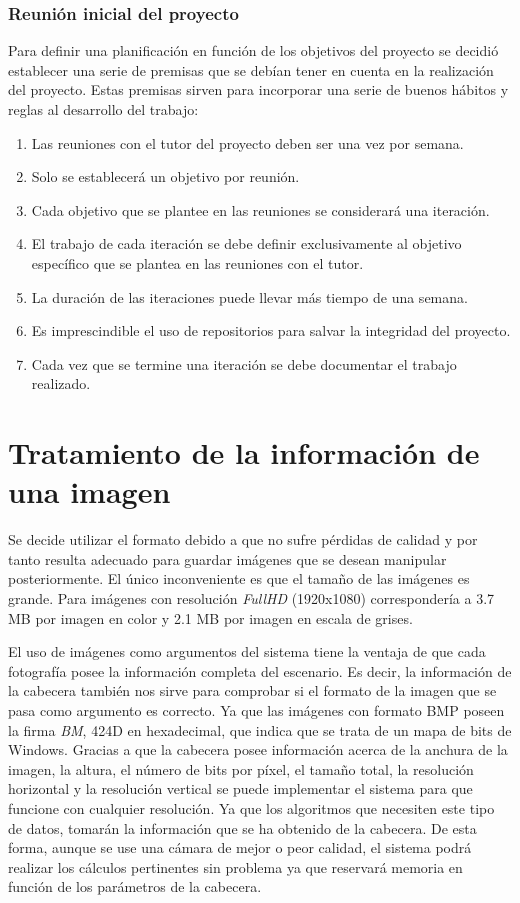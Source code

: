 \subsubsection{Reunión inicial del proyecto}\label{sec:Reunion}

Para definir una planificación en función de los objetivos del proyecto se decidió establecer una serie de premisas que se debían tener en cuenta en la realización del proyecto. Estas premisas sirven para incorporar una serie de buenos hábitos y reglas al desarrollo del trabajo: 

\begin{enumerate}
\item Las reuniones con el tutor del proyecto deben ser una vez por semana.
\item Solo se establecerá un objetivo por reunión.
\item Cada objetivo que se plantee en las reuniones se considerará una iteración.
\item El trabajo de cada iteración se debe definir exclusivamente al objetivo específico que se plantea en las reuniones con el tutor.
\item La duración de las iteraciones puede llevar más tiempo de una semana.
\item Es imprescindible el uso de repositorios para salvar la integridad del proyecto.
\item Cada vez que se termine una iteración se debe documentar el trabajo realizado.
\end{enumerate}

\section{Tratamiento de la información de una imagen}\label{sec:CabeceraBMP} 
Se decide utilizar el formato  debido a que no sufre pérdidas de calidad y por tanto resulta adecuado para guardar imágenes que se desean manipular posteriormente. El único inconveniente es que el tamaño de las imágenes es grande. Para imágenes con resolución \emph{FullHD} (1920x1080) correspondería a 3.7 \ac{MB} por imagen en color y 2.1 \ac{MB} por imagen en escala de grises.

El uso de imágenes como argumentos del sistema tiene la ventaja de que cada fotografía posee la información completa del escenario. Es decir, la información de la cabecera también nos sirve para comprobar si el formato de la imagen que se pasa como argumento es correcto. Ya que las imágenes con formato \ac{BMP} poseen la firma \emph{BM}, 424D en hexadecimal, que indica que se trata de un mapa de bits de Windows. Gracias a que la cabecera posee información acerca de la anchura de la imagen, la altura, el número de bits por píxel, el tamaño total, la resolución horizontal y la resolución vertical se puede implementar el sistema para que funcione con cualquier resolución. Ya que los algoritmos que necesiten este tipo de datos, tomarán la información que se ha obtenido de la cabecera. De esta forma, aunque se use una cámara de mejor o peor calidad, el sistema podrá realizar los cálculos pertinentes sin problema ya que reservará memoria en función de los parámetros de la cabecera.

